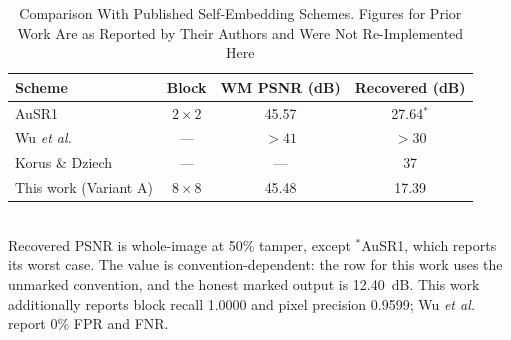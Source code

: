 \begin{table}[t]
\caption{Comparison With Published Self-Embedding Schemes. Figures for Prior Work
Are as Reported by Their Authors and Were Not Re-Implemented Here}
\label{tab:compare}
\centering
\footnotesize
\begin{tabular}{@{}lccc@{}}
\toprule
Scheme & Block & WM PSNR (dB) & Recovered (dB) \\
\midrule
AuSR1 \cite{ausr1}                         & $2\times2$ & 45.57 & 27.64$^{\ast}$ \\
Wu \emph{et al.} \cite{wu2026multifeature} & ---        & $>41$ & $>30$ \\
Korus \& Dziech \cite{korus2013efficient}  & ---        & ---   & 37 \\
This work (Variant A)                      & $8\times8$ & 45.48 & 17.39 \\
\bottomrule
\end{tabular}
\\[2pt]
\footnotesize Recovered PSNR is whole-image at 50\% tamper, except $^{\ast}$AuSR1,
which reports its worst case. The value is convention-dependent: the row for this
work uses the unmarked convention, and the honest marked output is 12.40~dB. This
work additionally reports block recall 1.0000 and pixel precision 0.9599;
Wu \emph{et al.} report 0\% FPR and FNR.
\end{table}
